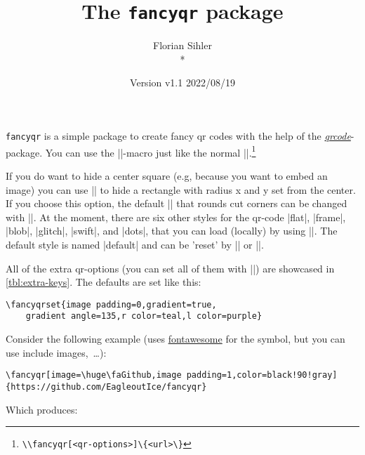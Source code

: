 \documentclass[parskip=half,english,numbers=noenddot,footnotes=nomultiple,oneside]{scrartcl}
\title{The \texttt{fancyqr} package}
\author{%
	\texorpdfstring{Florian Sihler\medskip\\*
		\fancyqr{https://github.com/EagleoutIce/fancyqr}
	}{Florian Sihler}}
\date{Version v1.1 \textendash{} 2022/08/19}
\def\ltx#1{\lstinline/#1/}
\begin{document}
   \maketitle


	\texttt{fancyqr} is a simple package to create fancy qr codes with the help of the \textit{\href{https://www.ctan.org/pkg/qrcode}{qrcode}}-package.
	You can use the |\fancyqr|-macro just like the normal |\qrcode|.\footnote{\ltx{\\fancyqr[<qr-options>]\{<url>\}}}

	If you do want to hide a center square (e.g, because you want to embed an image) you can use || to hide a rectangle with radius x and y set from the center. If you choose this option, the default |\FancyQrRoundCut| that rounds cut corners can be changed with |\FancyQrHardCut|.
	At the moment, there are six other styles for the qr-code |flat|, |frame|, |blob|, |glitch|, |swift|, and |dots|, that you can load (locally) by using ||. The default style is named |default| and can be 'reset' by || or |\FancyLoadDefault|.

	All of the extra qr-options (you can set all of them with ||) are showcased in \autoref{tbl:extra-keys}.
	The defaults are set like this:
\begin{lstlisting}
\fancyqrset{image padding=0,gradient=true,
	gradient angle=135,r color=teal,l color=purple}
\end{lstlisting}
	Consider the following example (uses \href{https://www.ctan.org/pkg/fontawesome}{fontawesome} for the symbol, but you can use include images,~\ldots):
\begin{lstlisting}
\fancyqr[image=\huge\faGithub,image padding=1,color=black!90!gray]{https://github.com/EagleoutIce/fancyqr}
\end{lstlisting}

	\parbox[c]{.3\linewidth}{Which produces:}\hfill\parbox[c]{.4\linewidth}{\raggedleft{}}\par
\end{document}

